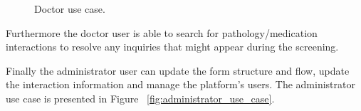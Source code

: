 \begin{figure}[H]
	\begin{center}
	\end{center}
	\caption{Doctor use case.}\label{fig:doctor_use_case}
\end{figure}

Furthermore the doctor user is able to search for pathology/medication interactions to resolve any inquiries that might appear during the screening.

Finally the administrator user can update the form structure and flow, update the interaction information and manage the platform's users.
The administrator use case is presented in Figure ~\ref{fig:administrator_use_case}.

